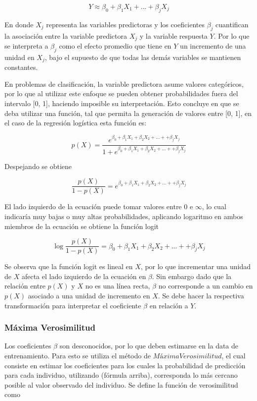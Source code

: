 \documentclass[a4paper,12pt]{Latex/Classes/PhDthesisPSnPDF}
\begin{document}
$$ Y \approx \beta_{0} + \beta_{1}X_{1} + ... + \beta_{j}X_{j} $$

En donde $X_{j}$ representa las variables predictoras y los coeficientes $\beta_{j}$ cuantifican la asociación entre la variable predictora $X_{j}$ y la variable respuesta $Y$. Por lo que se interpreta a $\beta_{j}$ como el efecto promedio que tiene en $Y$ un incremento de una unidad en $X_{j}$, bajo el supuesto de que todas las demás variables se mantienen constantes.

En problemas de clasificación, la variable predictora asume valores categóricos, por lo que al utilizar este enfoque se pueden obtener probabilidades fuera del intervalo [0, 1], haciendo imposible su interpretación. Esto concluye en que se deba utilizar una función, tal que permita la generación de valores entre [0, 1], en el caso de la regresión logística esta función es:

$$
p(X) = \frac{e^{\beta_{0} + \beta_{1}X_{1} + \beta_{2}X_{2} + ... + + \beta_{j}X_{j} }}{1 + e^{\beta_{0} + \beta_{1}X_{1} + \beta_{2}X_{2} + ... + + \beta_{j}X_{j} }}
$$

Despejando se obtiene

$$ \frac{p(X)}{1 - p(X)} = e^{\beta_{0} + \beta_{1}X_{1} + \beta_{2}X_{2} + ... + + \beta_{j}X_{j} } $$

El lado izquierdo de la ecuación puede tomar valores entre 0 e $\infty$, lo cual indicaría muy bajas o muy altas probabilidades, aplicando logaritmo en ambos miembros de la ecuación se obtiene la función logit

$$ \log{\frac{p(X)}{1 - p(X)}} = \beta_{0} + \beta_{1}X_{1} + \beta_{2}X_{2} + ... + + \beta_{j}X_{j}  $$

Se observa que la función logit es lineal en $X$, por lo que incrementar una unidad de $X$ afecta el lado izquierdo de la ecuación en $\beta$. Sin embargo dado que la relación entre $p(X)$ y $X$ no es una línea recta, $\beta$ no corresponde a un cambio en $p(X)$ asociado a una unidad de incremento en $X$. Se debe hacer la respectiva transformación para interpretar el coeficiente $\beta$ en relación a $Y$.

\subsubsection{Máxima Verosimilitud}

Los coeficientes $\beta$ son desconocidos, por lo que deben estimarse en la data de entrenamiento. Para esto se utiliza el método de $Máxima Verosimilitud$, el cual consiste en estimar los coeficientes para los cuales la probabilidad de predicción para cada individuo, utilizando (fórmula arriba), corresponda lo más cercano posible al valor observado del individuo. Se define la función de verosimilitud como
\end{document}
